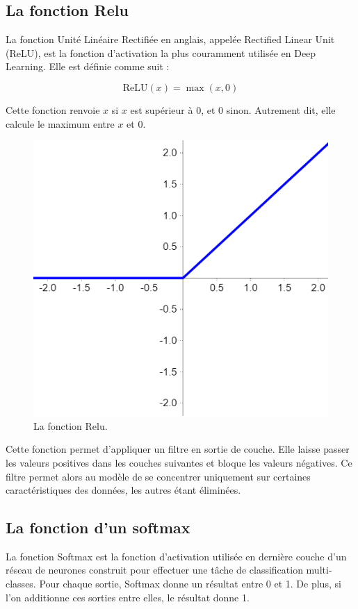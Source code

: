 \subsection{La fonction Relu }

La fonction Unité Linéaire Rectifiée en anglais, appelée Rectified Linear Unit (ReLU), est la fonction d'activation la plus couramment utilisée en Deep Learning. Elle est définie comme suit :

\[ \text{ReLU}(x) = \max(x, 0) \]

Cette fonction renvoie $x$ si $x$ est supérieur à 0, et 0 sinon. Autrement dit, elle calcule le maximum entre $x$ et 0.


\begin{figure}[h]
\centering
\includegraphics[scale=0.5]{Images/relu.png}
\caption{La fonction Relu.}
\label{fig:11}
\end{figure}

Cette fonction permet d’appliquer un filtre en sortie de couche. 
Elle laisse passer les valeurs positives dans les couches suivantes et bloque les valeurs négatives. 
Ce filtre permet alors au modèle de se concentrer uniquement sur certaines caractéristiques des données, les autres étant éliminées.

\subsection{La fonction d'un softmax }
La fonction Softmax est la fonction d'activation utilisée en dernière couche d'un réseau de neurones construit pour effectuer une tâche de classification multi-classes. Pour chaque sortie, Softmax donne un résultat entre 0 et 1. De plus, si l'on additionne ces sorties entre elles, le résultat donne 1.

